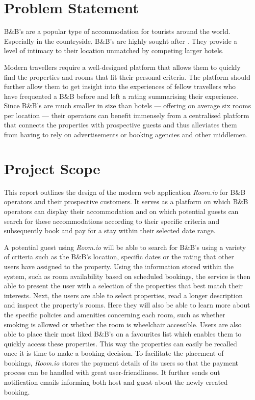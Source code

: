 \section{Problem Statement}

B\&B's are a popular type of accommodation for tourists around the world. Especially in the countryside, B\&B's are highly sought after \cite{thebnbindustry}. They provide a level of intimacy to their location unmatched by competing larger hotels.

Modern travellers require a well-designed platform that allows them to quickly find the properties and rooms that fit their personal criteria. The platform should further allow them to get insight into the experiences of fellow travellers who have frequented a B\&B before and left a rating summarising their experience.
Since B\&B's are much smaller in size than hotels --- offering on average six rooms per location \cite{thebnbindustry} --- their operators can benefit immensely from a centralised platform that connects the properties with prospective guests and thus alleviates them from having to rely on advertisements or booking agencies and other middlemen.

\section{Project Scope}
This report outlines the design of the modern web application \textit{Room.io} for B\&B operators and their prospective customers. It serves as a platform on which B\&B operators can display their accommodation and on which potential guests can search for these accommodations according to their specific criteria and subsequently book and pay for a stay within their selected date range.

A potential guest using \textit{Room.io} will be able to search for B\&B's using a variety of criteria such as the B\&B's location, specific dates or the rating that other users have assigned to the property. Using the information stored within the system, such as room availability based on scheduled bookings, the service is then able to present the user with a selection of the properties that best match their interests. Next, the users are able to select properties, read a longer description and inspect the property's rooms. Here they will also be able to learn more about the specific policies and amenities concerning each room, such as whether smoking is allowed or whether the room is wheelchair accessible. Users are also able to place their most liked B\&B's on a favourites list which enables them to quickly access these properties. This way the properties can easily be recalled once it is time to make a booking decision. To facilitate the placement of bookings, \textit{Room.io} stores the payment details of its users so that the payment process can be handled with great user-friendliness. It further sends out notification emails informing both host and guest about the newly created booking.

